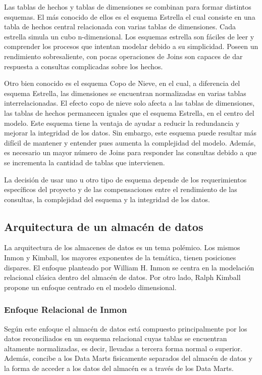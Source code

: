 Las tablas de hechos y tablas de dimensiones se combinan para formar distintos esquemas. El m\'as conocido 
de ellos es el esquema Estrella el cual consiste en una tabla de hechos central relacionada con varias tablas 
de dimensiones. Cada estrella simula un cubo n-dimensional. Los esquemas estrella son f\'aciles de leer y comprender 
los procesos que intentan modelar debido 
a su simplicidad. Poseen un rendimiento sobresaliente, con pocas operaciones de Joins son capaces de dar respuesta 
a consultas complicadas sobre los hechos.

Otro bien conocido es el esquema Copo de Nieve, en el cual, a diferencia del esquema Estrella, las dimensiones se encuentran 
normalizadas en varias tablas interrelacionadas. El efecto copo de nieve solo afecta a las tablas de dimensiones, las tablas de hechos 
permanecen iguales que el esquema Estrella, en el centro del modelo. Este esquema tiene la ventaja de ayudar a reducir la redundancia 
y mejorar la integridad de los datos. Sin embargo, este esquema puede resultar m\'as difícil de mantener y entender pues aumenta 
la complejidad del modelo. Adem\'as, es necesario un mayor n\'umero de Joins para responder las consultas debido a que se incrementa
la cantidad de tablas que intervienen.

La decisi\'on de usar uno u otro tipo de esquema depende de los requerimientos espec\'ificos del proyecto y de las compensaciones entre 
el rendimiento de las consultas, la complejidad del esquema y la integridad de los datos.


\subsection{Arquitectura de un almac\'en de datos}

La arquitectura de los almacenes de datos es un tema pol\'emico. Los mismos Inmon y Kimball, los mayores exponentes de la tem\'atica, 
tienen posiciones dispares. El enfoque planteado por William H. Inmon se centra en la modelación relacional cl\'asica dentro 
del almacén de datos. Por otro lado, Ralph Kimball propone un enfoque centrado en el modelo dimensional.

\subsubsection{Enfoque Relacional de Inmon}

Seg\'un este enfoque el almacén de datos est\'a compuesto principalmente por los datos reconciliados en un esquema 
relacional cuyas tablas se encuentran altamente normalizadas, es decir, llevadas a tercera forma normal o superior\cite{inmon2005building}. 
Adem\'as, concibe a los Data Marts fisicamente separados del almacén de datos y la forma de acceder a los datos del almacén es a 
través de los Data Marts.

